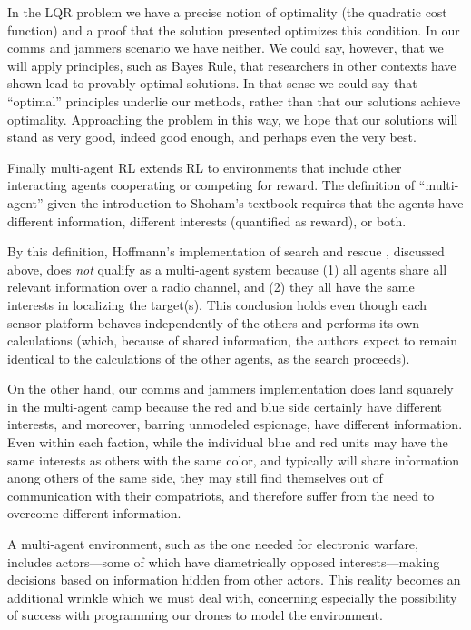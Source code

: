 \documentclass{article}
\begin{document}
In the LQR problem we have a precise notion of optimality (the
quadratic cost function) and a proof that the solution presented
optimizes this condition.  In our comms and jammers scenario we have
neither.  We could say, however, that we will apply principles, such
as Bayes Rule, that researchers in other contexts have shown lead to
provably optimal solutions.  In that sense we could say that
``optimal'' principles underlie our methods, rather than that our
solutions achieve optimality.  Approaching the problem in this way, we
hope that our solutions will stand as very good, indeed good enough,
and perhaps even the very best.

Finally multi-agent RL \cite{bucsoniu2010multi} extends RL to
environments that include other interacting agents cooperating or
competing for reward.  The definition of ``multi-agent'' given the
introduction to Shoham's textbook \cite{shoham2008multiagent} requires
that the agents have different information, different interests
(quantified as reward), or both.

By this definition, Hoffmann's implementation of search and rescue
\cite{hoffmann2009mobile}, discussed above, does \emph{not} qualify as
a multi-agent system because (1) all agents share all relevant
information over a radio channel, and (2) they all have the same
interests in localizing the target(s).  This conclusion holds even
though each sensor platform behaves independently of the others and
performs its own calculations (which, because of shared information,
the authors expect to remain identical to the calculations of the
other agents, as the search proceeds).

On the other hand, our comms and jammers implementation does land
squarely in the multi-agent camp because the red and blue side
certainly have different interests, and moreover, barring unmodeled
espionage, have different information.  Even within each faction,
while the individual blue and red units may have the same interests as
others with the same color, and typically will share information anong
others of the same side, they may still find themselves out of
communication with their compatriots, and therefore suffer from the
need to overcome different information.

A multi-agent environment, such as the one needed for electronic
warfare, includes actors---some of which have diametrically opposed
interests---making decisions based on information hidden from other
actors.  This reality becomes an additional wrinkle which we must deal
with, concerning especially the possibility of success with
programming our drones to model the environment.
\end{document}

